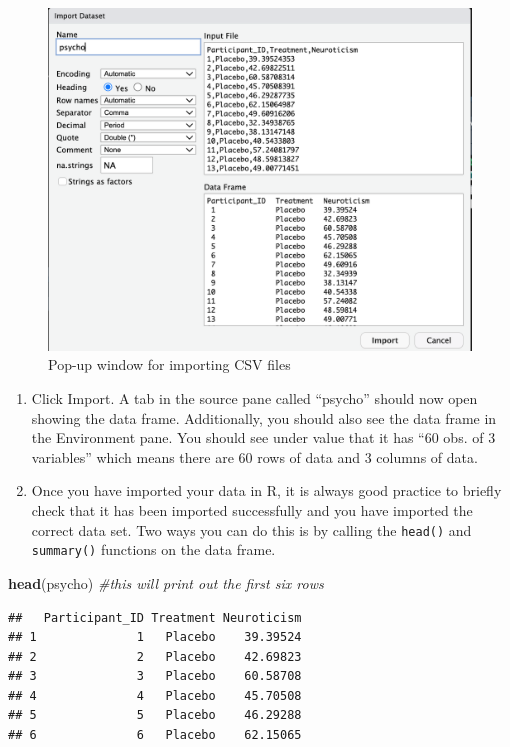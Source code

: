 \documentclass[
]{book}
\newenvironment{Shaded}{\begin{snugshade}}{\end{snugshade}}
\newcommand{\CommentTok}[1]{\textcolor[rgb]{0.56,0.35,0.01}{\textit{#1}}}
\newcommand{\FunctionTok}[1]{\textcolor[rgb]{0.13,0.29,0.53}{\textbf{#1}}}
\newcommand{\NormalTok}[1]{#1}
\providecommand{\tightlist}{%
  \setlength{\itemsep}{0pt}\setlength{\parskip}{0pt}}
\begin{document}
\begin{figure}
\centering
\includegraphics{img/04-import-csv.png}
\caption{\label{fig:unnamed-chunk-160}Pop-up window for importing CSV files}
\end{figure}

\begin{enumerate}
\def\labelenumi{\arabic{enumi}.}
\setcounter{enumi}{7}
\tightlist
\item
  Click Import. A tab in the source pane called ``psycho'' should now open showing the data frame. Additionally, you should also see the data frame in the Environment pane. You should see under value that it has ``60 obs. of 3 variables'' which means there are 60 rows of data and 3 columns of data.
\item
  Once you have imported your data in R, it is always good practice to briefly check that it has been imported successfully and you have imported the correct data set. Two ways you can do this is by calling the \texttt{head()} and \texttt{summary()} functions on the data frame.
\end{enumerate}

\begin{Shaded}
\begin{Highlighting}[]
\FunctionTok{head}\NormalTok{(psycho) }\CommentTok{\#this will print out the first six rows}
\end{Highlighting}
\end{Shaded}

\begin{verbatim}
##   Participant_ID Treatment Neuroticism
## 1              1   Placebo    39.39524
## 2              2   Placebo    42.69823
## 3              3   Placebo    60.58708
## 4              4   Placebo    45.70508
## 5              5   Placebo    46.29288
## 6              6   Placebo    62.15065
\end{verbatim}
\end{document}
